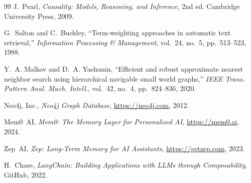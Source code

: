 \documentclass[11pt,a4paper]{article}
\begin{document}
\begin{thebibliography}{99}
J.~Pearl,
\textit{Causality: Models, Reasoning, and Inference}, 2nd ed.
Cambridge University Press, 2009.

G.~Salton and C.~Buckley,
``Term-weighting approaches in automatic text retrieval,''
\textit{Information Processing \& Management}, vol.~24, no.~5, pp.~513--523, 1988.

Y.~A. Malkov and D.~A. Yashunin,
``Efficient and robust approximate nearest neighbor search using hierarchical
navigable small world graphs,''
\textit{IEEE Trans. Pattern Anal. Mach. Intell.}, vol.~42, no.~4, pp.~824--836,
2020.

Neo4j, Inc.,
\textit{Neo4j Graph Database},
\url{https://neo4j.com}, 2012.

Mem0~AI,
\textit{Mem0: The Memory Layer for Personalized AI},
\url{https://mem0.ai}, 2024.

Zep~AI,
\textit{Zep: Long-Term Memory for AI Assistants},
\url{https://getzep.com}, 2023.

H.~Chase,
\textit{LangChain: Building Applications with LLMs through Composability},
GitHub, 2022.

\end{thebibliography}
\end{document}
